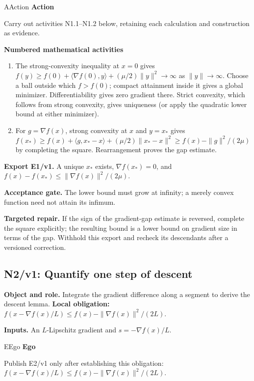 \documentclass[preprint,12pt,aps,pra,showkeys,amsmath,amssymb,superscriptaddress,floatfix]{revtex4-2}
\theoremstyle{definition}
\theoremstyle{remark}
\newcommand{\mmfaculty}[3]{%
 \begin{mmfacultybox}{#1}{#2}
 {\sffamily\bfseries\color{MMBlue}#2}\par\smallskip #3
 \end{mmfacultybox}}
\newcommand{\field}[2]{\par\smallskip\noindent\textbf{#1.} #2\par}
\begin{document}
\mmfaculty{A}{Action}{Carry out activities N1.1--N1.2 below, retaining each calculation and
construction as evidence.}

\smallskip\noindent\textbf{Numbered mathematical activities}

\begin{enumerate}[label=N1.\arabic*,leftmargin=3.4em]

\item The strong-convexity inequality at \(x=0\) gives
\(f(y)\ge f(0)+\langle\nabla f(0),y\rangle+(\mu/2)\|y\|^2\to\infty\) as
\(\|y\|\to\infty\). Choose a ball outside which \(f>f(0)\); compact
attainment inside it gives a global minimizer. Differentiability gives
zero gradient there. Strict convexity, which follows from strong
convexity, gives uniqueness (or apply the quadratic lower bound at
either minimizer).

\item For \(g=\nabla f(x)\), strong convexity at \(x\) and \(y=x_*\) gives
\(f(x_*)\ge f(x)+\langle g,x_*-x\rangle+(\mu/2)\|x_*-x\|^2\ge f(x)-\|g\|^2/(2\mu)\)
by completing the square. Rearrangement proves the gap estimate.

\end{enumerate}

\field{Export E1/v1}{A unique \(x_*\) exists, \(\nabla f(x_*)=0\), and
\(f(x)-f(x_*)\le\|\nabla f(x)\|^2/(2\mu)\).}

\field{Acceptance gate}{The lower bound must grow at infinity; a merely convex function need not
attain its infimum.}

\field{Targeted repair}{If the sign of the gradient-gap estimate is reversed, complete the
square explicitly; the resulting bound is a lower bound on gradient size
in terms of the gap. Withhold this export and recheck its descendants
after a versioned correction.}

\clearpage

\subsection{N2/v1: Quantify one step of descent}

\field{Object and role}{Integrate the gradient difference along a segment to derive the descent
lemma. \textbf{Local obligation:}
\(f(x-\nabla f(x)/L)\le f(x)-\|\nabla f(x)\|^2/(2L)\).}

\field{Inputs}{An \(L\)-Lipschitz gradient and \(s=-\nabla f(x)/L\).}

\mmfaculty{E}{Ego}{Publish E2/v1 only after establishing this obligation:
\(f(x-\nabla f(x)/L)\le f(x)-\|\nabla f(x)\|^2/(2L)\).}
\end{document}
